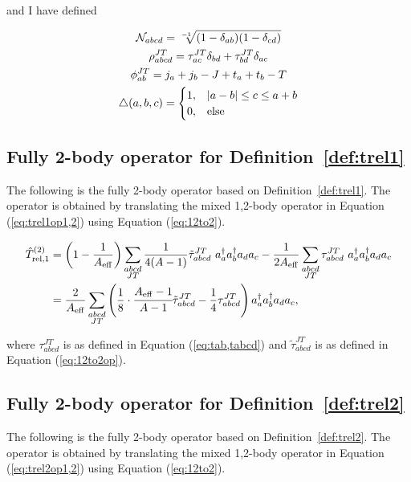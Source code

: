 \documentclass{article}
\def\aeff{A_{\rm{eff}}}
\def\trelopi_#1^#2{\hat{T}_{\rm{rel}, #1}^{#2}}
\def\creop{a^{\dagger}}
\def\annop{a}
\begin{document}
and I have defined

\begin{gather*}
  \mathcal{N}_{abcd} = \sqrt[-1]{(1-\delta_{ab})(1-\delta_{cd})}\\
  \rho_{abcd}^{JT} = \tau_{ac}^{JT}\delta_{bd} + \tau_{bd}^{JT}\delta_{ac}\\
  \phi_{ab}^{JT} = j_a+j_b-J + t_a+t_b-T\\
  \bigtriangleup(a,b,c) = 
  \begin{cases}
    1, & |a-b|\leq c\leq a+b\\
    0, & \rm{else}\\
  \end{cases}
\end{gather*}

\subsection{Fully 2-body operator for Definition~\ref{def:trel1}}
The following is the fully 2-body operator based on Definition~\ref{def:trel1}.
The operator is obtained by translating the mixed 1,2-body operator in
Equation (\ref{eq:trel1op1,2}) using Equation (\ref{eq:12to2}).

\begin{equation}\label{eq:trel1op2}
  \begin{aligned}
    \trelopi_1^{(2)} &= \left(1-\frac{1}{\aeff}\right)
    \displaystyle\sum_{\substack{abcd\\JT}} \frac{1}{4(A-1)}
    \tilde{\tau}_{abcd}^{JT}~\creop_a\creop_b\annop_d\annop_c
    -\frac{1}{2\aeff} \displaystyle\sum_{\substack{abcd\\JT}}
    \tau_{abcd}^{JT}~\creop_a\creop_b\annop_d\annop_c\\
    &= \frac{2}{\aeff} \displaystyle\sum_{\substack{abcd\\JT}}
    \left(
    \frac{1}{8}\cdot\cfrac{\aeff-1}{A-1}
    \tilde{\tau}_{abcd}^{JT} -\frac{1}{4}\tau_{abcd}^{JT}
    \right)\creop_a\creop_b\annop_d\annop_c,
  \end{aligned}
\end{equation}

where $\tau_{abcd}^{JT}$ is as defined in Equation (\ref{eq:tab,tabcd}) and
$\tilde{\tau}_{abcd}^{JT}$ is as defined in Equation (\ref{eq:12to2op}).

\subsection{Fully 2-body operator for Definition~\ref{def:trel2}}
The following is the fully 2-body operator based on Definition~\ref{def:trel2}.
The operator is obtained by translating the mixed 1,2-body operator in
Equation (\ref{eq:trel2op1,2}) using Equation (\ref{eq:12to2}).
\end{document}
